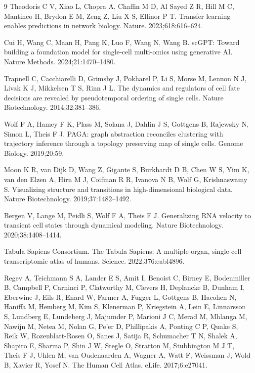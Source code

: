 \documentclass{article}
\begin{document}
\begin{thebibliography}{9}
Theodoris C V, Xiao L, Chopra A, Chaffin M D, Al Sayed Z R, Hill M C, Mantineo H, Brydon E M, Zeng Z, Liu X S, Ellinor P T. Transfer learning enables predictions in network biology. Nature. 2023;618:616--624.

Cui H, Wang C, Maan H, Pang K, Luo F, Wang N, Wang B. scGPT: Toward building a foundation model for single-cell multi-omics using generative AI. Nature Methods. 2024;21:1470--1480.

Trapnell C, Cacchiarelli D, Grimsby J, Pokharel P, Li S, Morse M, Lennon N J, Livak K J, Mikkelsen T S, Rinn J L. The dynamics and regulators of cell fate decisions are revealed by pseudotemporal ordering of single cells. Nature Biotechnology. 2014;32:381--386.

Wolf F A, Hamey F K, Plass M, Solana J, Dahlin J S, Gottgens B, Rajewsky N, Simon L, Theis F J. PAGA: graph abstraction reconciles clustering with trajectory inference through a topology preserving map of single cells. Genome Biology. 2019;20:59.

Moon K R, van Dijk D, Wang Z, Gigante S, Burkhardt D B, Chen W S, Yim K, van den Elzen A, Hirn M J, Coifman R R, Ivanova N B, Wolf G, Krishnaswamy S. Visualizing structure and transitions in high-dimensional biological data. Nature Biotechnology. 2019;37:1482--1492.

Bergen V, Lange M, Peidli S, Wolf F A, Theis F J. Generalizing RNA velocity to transient cell states through dynamical modeling. Nature Biotechnology. 2020;38:1408--1414.

Tabula Sapiens Consortium. The Tabula Sapiens: A multiple-organ, single-cell transcriptomic atlas of humans. Science. 2022;376:eabl4896.

Regev A, Teichmann S A, Lander E S, Amit I, Benoist C, Birney E, Bodenmiller B, Campbell P, Carninci P, Clatworthy M, Clevers H, Deplancke B, Dunham I, Eberwine J, Eils R, Enard W, Farmer A, Fugger L, Gottgens B, Hacohen N, Haniffa M, Hemberg M, Kim S, Klenerman P, Kriegstein A, Lein E, Linnarsson S, Lundberg E, Lundeberg J, Majumder P, Marioni J C, Merad M, Mhlanga M, Nawijn M, Netea M, Nolan G, Pe'er D, Phillipakis A, Ponting C P, Quake S, Reik W, Rozenblatt-Rosen O, Sanes J, Satija R, Schumacher T N, Shalek A, Shapiro E, Sharma P, Shin J W, Stegle O, Stratton M, Stubbington M J T, Theis F J, Uhlen M, van Oudenaarden A, Wagner A, Watt F, Weissman J, Wold B, Xavier R, Yosef N. The Human Cell Atlas. eLife. 2017;6:e27041.


\end{thebibliography}
\end{document}
